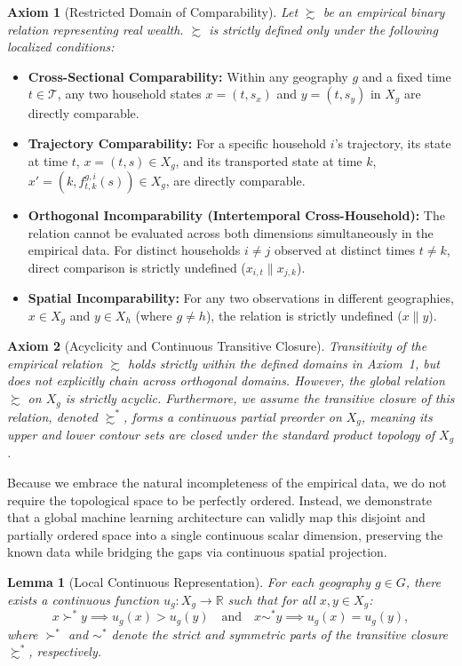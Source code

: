 \documentclass{article}
\newtheorem{lemma}{Lemma}
\begin{document}
\textbf{Axiom 1} (Restricted Domain of Comparability). \textit{Let $\succsim$ be an
empirical binary relation representing real wealth. $\succsim$ is strictly defined only
under the following localized conditions:}
\begin{itemize}
    \item \textbf{Cross-Sectional Comparability:} Within any geography $g$ and a fixed
    time $t \in \mathcal{T}$, any two household states $x = (t, s_x)$ and
    $y = (t, s_y)$ in $X_g$ are directly comparable.
    \item \textbf{Trajectory Comparability:} For a specific household $i$'s trajectory,
    its state at time $t$, $x = (t, s) \in X_g$, and its transported state at time $k$,
    $x' = (k, f^{g,i}_{t,k}(s)) \in X_g$, are directly comparable.
    \item \textbf{Orthogonal Incomparability (Intertemporal Cross-Household):} The
    relation cannot be evaluated across both dimensions simultaneously in the empirical
    data. For distinct households $i \neq j$ observed at distinct times $t \neq k$,
    direct comparison is strictly undefined ($x_{i,t} \parallel x_{j,k}$).
    \item \textbf{Spatial Incomparability:} For any two observations in different
    geographies, $x \in X_g$ and $y \in X_h$ (where $g \neq h$), the relation is
    strictly undefined ($x \parallel y$).
\end{itemize}

\textbf{Axiom 2} (Acyclicity and Continuous Transitive Closure). \textit{Transitivity
of the empirical relation $\succsim$ holds strictly within the defined domains in
Axiom~1, but does not explicitly chain across orthogonal domains. However, the global
relation $\succsim$ on $X_g$ is strictly acyclic. Furthermore, we assume the transitive
closure of this relation, denoted $\succsim^*$, forms a continuous partial preorder on
$X_g$, meaning its upper and lower contour sets are closed under the standard product
topology of $X_g$.}

Because we embrace the natural incompleteness of the empirical data, we do not require
the topological space to be perfectly ordered. Instead, we demonstrate that a global
machine learning architecture can validly map this disjoint and partially ordered space
into a single continuous scalar dimension, preserving the known data while bridging the
gaps via continuous spatial projection.

\begin{lemma}[Local Continuous Representation]
For each geography $g \in G$, there exists a continuous function
$u_g : X_g \to \mathbb{R}$ such that for all $x, y \in X_g$:
$$x \succ^* y \implies u_g(x) > u_g(y)
  \quad\text{and}\quad
  x \sim^* y \implies u_g(x) = u_g(y),$$
where $\succ^*$ and $\sim^*$ denote the strict and symmetric parts of the transitive
closure $\succsim^*$, respectively.
\end{lemma}
\end{document}
